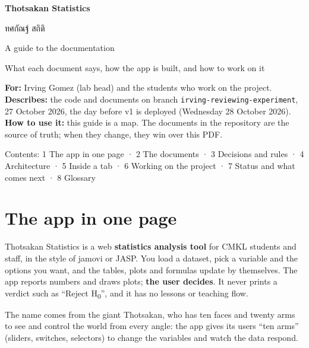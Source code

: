\documentclass[11pt,a4paper]{article}
\newcommand{\f}[1]{\texttt{#1}}
\begin{document}
\begin{titlepage}
\vspace*{3cm}
{\color{accent}\Huge\bfseries Thotsakan Statistics\par}
\vspace{4pt}
{\Large{\thai ทศกัณฐ์ สถิติ}\par}
\vspace{18pt}
{\LARGE A guide to the documentation\par}
\vspace{10pt}
{\large\color{muted} What each document says, how the app is built, and how to work on it\par}
\vspace{2.5cm}
\begin{note}
\textbf{For:} Irving Gomez (lab head) and the students who work on the project.\\[3pt]
\textbf{Describes:} the code and documents on branch \f{irving-reviewing-experiment}, 27 October 2026,
the day before v1 is deployed (Wednesday 28 October 2026).\\[3pt]
\textbf{How to use it:} this guide is a map. The documents in the repository are the source of truth; when
they change, they win over this PDF.
\end{note}
\vfill
{\color{muted}\small Contents: 1 The app in one page · 2 The documents · 3 Decisions and rules · 4 Architecture ·
5 Inside a tab · 6 Working on the project · 7 Status and what comes next · 8 Glossary\par}
\end{titlepage}

\section{The app in one page}

Thotsakan Statistics is a web \textbf{statistics analysis tool} for CMKL students and staff, in the style of
jamovi or JASP. You load a dataset, pick a variable and the options you want, and the tables, plots and
formulas update by themselves. The app reports numbers and draws plots; \textbf{the user decides}. It never
prints a verdict such as ``Reject H\textsubscript{0}'', and it has no lessons or teaching flow.

The name comes from the giant Thotsakan, who has ten faces and twenty arms to see and control the world from
every angle: the app gives its users ``ten arms'' (sliders, switches, selectors) to change the variables and
watch the data respond.
\end{document}
